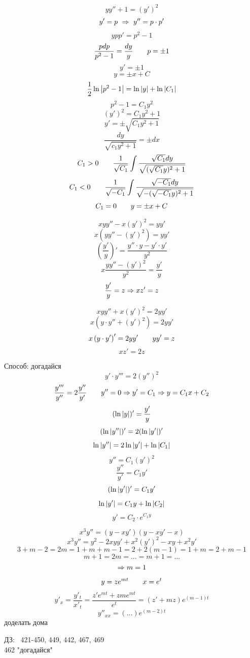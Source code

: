 \documentclass[12pt, fleqn]{article}
\begin{document}
\begin{lect}
    \begin{Task}[226]
        \[yy'' + 1 = (y')^2\]
        \[y' = p\ \Rightarrow\ y'' = p \cdot p'\]
        \[ypp' = p^2 - 1\]
        \[\frac{pdp}{p^2 - 1} = \frac{dy}{y} \qquad p = \pm 1\]
        \[y' = \pm 1\]
        \[y = \pm x + C\]
        \[\frac{1}{2}\ln\left|p^2 - 1\right| = \ln\left|y\right| + \ln \left|C_1\right|\]
        \[p^2 - 1 = C_1y^2\]
        \[(y')^2 = C_1y^2 + 1\]
        \[y' = \pm \sqrt{C_1 y^2 + 1}\]
        \[\frac{dy}{\sqrt{c_1y^2 + 1}} = \pm dx\]
        \[C_1 > 0 \qquad \frac{1}{\sqrt{C_1}} \int \frac{\sqrt{C_1}dy}{\sqrt{(\sqrt{C_1}y)^2 + 1}}\]
        \[C_1 < 0 \qquad \frac{1}{\sqrt{-C_1}} \int \frac{\sqrt{-C_1}dy}{\sqrt{-(\sqrt{-C_1}y)^2 + 1}}\]
        \[C_1 = 0 \qquad y = \pm x + C\]
    \end{Task}

    \begin{Task}[?]
        \[xyy'' - x(y')^2 = yy'\]
        \[x(yy'' - (y')^2) = yy'\]
        \[\left(\frac{y'}{y}\right)' = \frac{y'' \cdot y - y' \cdot y'}{y^2}\]
        \[x\frac{yy'' - (y')^2}{y^2} = \frac{y'}{y}\]
        \[\frac{y'}{y} = z \Rightarrow xz' = z\]
    \end{Task}

    \begin{Task}[366]
        \[xyy'' + x(y')^2 = 2yy'\]
        \[x(y \cdot y'' + (y')^2) = 2yy'\]
        \[x\left(y \cdot y'\right)' = 2yy' \qquad yy' = z\]
        \[xz' = 2z\]
    \end{Task}

     
    \begin{Task}[466]
        Способ: догадайся
        \[y' \cdot y''' = 2(y'')^2\]
        \[\frac{y'''}{y''} = 2 \frac{y''}{y'} \qquad y'' = 0 \Rightarrow y' = C_1 \Rightarrow y = C_1x + C_2\]
        \[(\ln \left|y\right|)' = \frac{y'}{y}\]
        \[(\ln \left|y''\right|)' = 2(\ln \left|y'\right|)'\]
        \[\ln \left|y''\right| = 2\ln \left|y'\right| + \ln \left|C_1\right|\]
        \[y'' = C_1 (y')^2\]
        \[\frac{y''}{y'} = C_1 y'\]
        \[(\ln \left|y'\right|)' = C_1 y'\]
        \[\ln \left|y'\right| = C_1 y + \ln \left|C_2\right|\]
        \[y' = C_2 \cdot e^{C_1 y} \]
    \end{Task}

    \begin{Task}[?]
        \[x^3 y'' = (y - xy')(y - xy' - x)\]
        \[x^3 y'' = y^2 - 2xyy' + x^2(y')^2 - xy + x^2 y'\]
        \[3 + m - 2 = 2m = 1 + m + m -1 = 2 + 2(m - 1) = 1 + m = 2 + m - 1\]
        \[m + 1 = 2m = ... = m + 1 = ...\]
        \[\Rightarrow m = 1\]
        \[y = ze^{mt} \qquad x = e^t \]
        \[y'_x = \frac{y'_t}{x'_t} = \frac{z' e^{mt} + zm e^{mt}  }{e^t} = (z' + mz)e^{(m - 1)t} \]
        \[y''_{xx} = (...) e^{(m - 2)t}  \]
        доделать дома
    \end{Task}

    ДЗ: \ 421-450, 449, 442, 467, 469\\
    462 "догадайся"
    

\end{lect}
\end{document}
